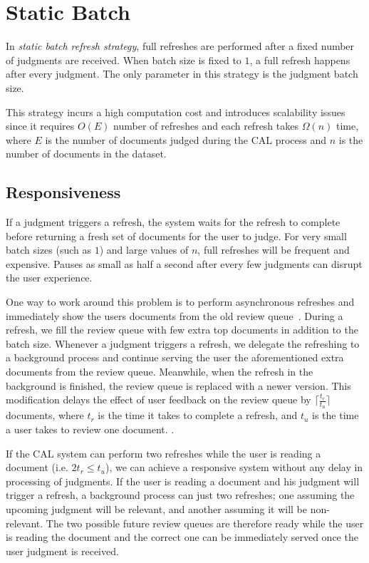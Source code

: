 \section{Static Batch}

In \textit{static batch refresh strategy}, full refreshes are performed after a
fixed number of judgments are received. When batch size is fixed to $1$, a full
refresh happens after every judgment. The only parameter in this strategy is the
judgment batch size.

This strategy incurs a high computation cost and introduces scalability issues
since it requires $O(E)$ number of refreshes and each refresh takes $\Omega(n)$
time, where $E$ is the number of documents judged during the CAL process and
$n$ is the number of documents in the dataset.

\subsection{Responsiveness}
If a judgment triggers a refresh, the system waits for the refresh to complete
before returning a fresh set of documents for the user to judge.
For very small batch sizes (such as $1$) and large values of $n$, full refreshes
will be frequent and expensive. Pauses as small as half a second after every few
judgments can disrupt the user experience.

One way to work around this problem is to perform asynchronous refreshes and
immediately show the users documents from the old review
queue~\cite{zhang2017uwaterloomds}. During a refresh, we fill the review queue
with few extra top documents in addition to the batch size. Whenever a judgment
triggers a refresh, we delegate the refreshing to a background process and
continue serving the user the aforementioned extra documents from the review
queue. Meanwhile, when the refresh in the background is finished, the review
queue is replaced with a newer version. This modification delays the effect of
user feedback on the review queue by $\lceil\frac{t_r}{t_u}\rceil$ documents,
where $t_r$ is the time it takes to complete a refresh, and $t_u$ is the time a
user takes to review one document.  .

If the CAL system can perform two refreshes while the user is reading a
document (i.e. $2t_r \le t_u$), we can achieve a responsive system without any
delay in processing of judgments. If the user is reading a document and his
judgment will trigger a refresh, a background process can just two refreshes;
one assuming the upcoming judgment will be relevant, and another assuming it
will be non-relevant.  The two possible future review queues are therefore ready
while the user is reading the document and the correct one can be immediately
served once the user judgment is received.


